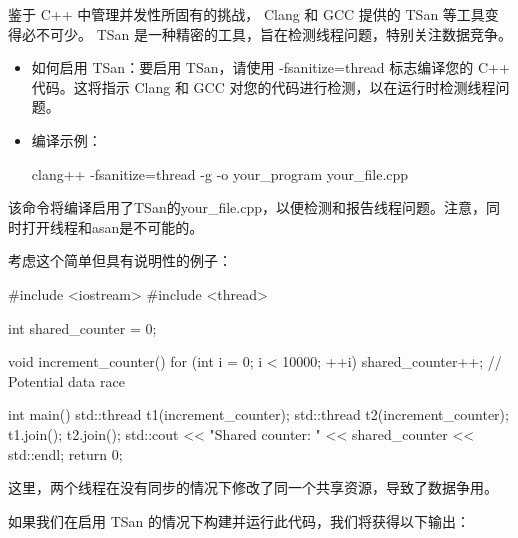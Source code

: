 
鉴于 C++ 中管理并发性所固有的挑战， Clang 和 GCC 提供的 TSan 等工具变得必不可少。 TSan 是一种精密的工具，旨在检测线程问题，特别关注数据竞争。


\begin{itemize}
\item
如何启用 TSan：要启用 TSan，请使用 -fsanitize=thread 标志编译您的 C++ 代码。这将指示 Clang 和 GCC 对您的代码进行检测，以在运行时检测线程问题。

\item
编译示例：
\begin{shell}
clang++ -fsanitize=thread -g -o your_program your_file.cpp
\end{shell}
\end{itemize}

该命令将编译启用了TSan的your\_file.cpp，以便检测和报告线程问题。注意，同时打开线程和asan是不可能的。


考虑这个简单但具有说明性的例子：

\begin{cpp}
#include <iostream>
#include <thread>

int shared_counter = 0;

void increment_counter() {
    for (int i = 0; i < 10000; ++i) {
        shared_counter++; // Potential data race
    }
}

int main() {
    std::thread t1(increment_counter);
    std::thread t2(increment_counter);
    t1.join();
    t2.join();
    std::cout << "Shared counter: " << shared_counter << std::endl;
    return 0;
}
\end{cpp}

这里，两个线程在没有同步的情况下修改了同一个共享资源，导致了数据争用。

如果我们在启用 TSan 的情况下构建并运行此代码，我们将获得以下输出：

